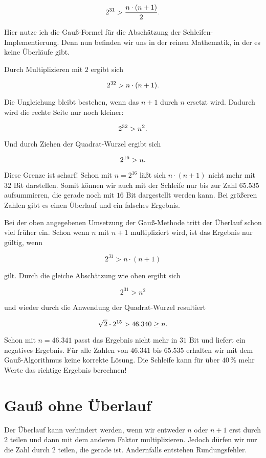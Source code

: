 \documentclass[a5paper,landscape,ngerman,10pt]{article}
\begin{document}
\[2^{31} > \frac{n\cdot(n + 1)}2\hbox{.}\]

Hier nutze ich die Gauß-Formel für die Abschätzung der
Schleifen-Implementierung.
Denn nun befinden wir uns in der reinen Mathematik, in der es keine
Überläufe gibt.

Durch Multiplizieren mit $2$ ergibt sich

\[2^{32} > n\cdot(n+1)\hbox{.}\]

Die Ungleichung bleibt bestehen, wenn das $n+1$ durch $n$
ersetzt wird. Dadurch wird die rechte Seite nur noch kleiner:

\[2^{32} > n^2\hbox{.}\]

Und durch Ziehen der Quadrat-Wurzel ergibt sich

\[2^{16} > n\hbox{.}\]

Diese Grenze ist scharf! Schon mit $n=2^{16}$ läßt sich
$n\cdot(n+1)$ nicht mehr mit $32$ Bit darstellen.
Somit können wir auch mit der Schleife nur bis zur Zahl $65.535$
aufsummieren, die gerade noch mit $16$ Bit dargestellt werden kann.
Bei größeren Zahlen gibt es einen Überlauf und ein falsches Ergebnis.

Bei der oben angegebenen Umsetzung der Gauß-Methode tritt der
Überlauf schon viel früher ein.
Schon wenn $n$ mit $n+1$ multipliziert wird, ist das Ergebnis nur gültig,
wenn

\[2^{31}>n\cdot(n+1)\]

gilt.
Durch die gleiche Abschätzung wie oben ergibt sich

\[2^{31}>n^2\]

und wieder durch die Anwendung der Quadrat-Wurzel resultiert

\[\sqrt{2}\cdot2^{15}>46.340\geq n\hbox{.}\]

Schon mit $n=46.341$ passt das Ergebnis nicht mehr in $31$ Bit und liefert
ein negatives Ergebnis.
Für alle Zahlen von $46.341$ bis $65.535$ erhalten wir mit dem
Gauß-Algorithmus keine korrekte Lösung.
Die Schleife kann für über $40\,\%$ mehr Werte das richtige Ergebnis
berechnen!

\section{Gauß ohne Überlauf}

Der Überlauf kann verhindert werden, wenn wir entweder $n$ oder
$n+1$ erst durch $2$ teilen und dann mit dem anderen Faktor
multiplizieren.
Jedoch dürfen wir nur die Zahl durch $2$ teilen, die gerade
ist.
Andernfalls entstehen Rundungsfehler.
\end{document}
